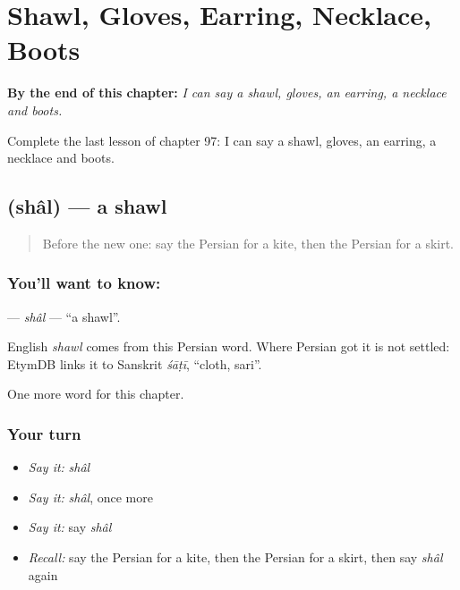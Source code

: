 
\chapter{Shawl, Gloves, Earring, Necklace, Boots}
\label{ch:fa-shawl-gloves-earring-necklace-boots}

\begin{chapteropening}
\textbf{By the end of this chapter:} \emph{I can say a shawl, gloves, an earring, a necklace and boots.}

Complete the last lesson of chapter 97: I can say a shawl, gloves, an earring, a necklace and boots.
\end{chapteropening}

\section[\texorpdfstring{\fa{شال} (shâl)}{شال (shâl)}]{ (shâl) — a shawl}

\label{lesson:FA-C97-shal}



\begin{quote}
Before the new one: say the Persian for a kite, then the Persian for a skirt.
\end{quote}

\subsection*{You'll want to know: }
\textbf{} — \emph{shâl} — \textquotedblleft{}a shawl\textquotedblright{}.

\begin{cousinweb}
English \emph{shawl} comes from this Persian word. Where Persian got it is not settled: EtymDB links it to Sanskrit \emph{śāṭī}, \textquotedblleft{}cloth, sari\textquotedblright{}.
\end{cousinweb}

\begin{grammarlens}[title={What you've built}]
One more word for this chapter.
\end{grammarlens}

\subsection*{Your turn}
\begin{itemize}
\raggedright
  \item \emph{Say it:} \emph{shâl}
  \item \emph{Say it:} \emph{shâl}, once more
  \item \emph{Say it:} say \emph{shâl}
  \item \emph{Recall:} say the Persian for a kite, then the Persian for a skirt, then say \emph{shâl} again
\end{itemize}

